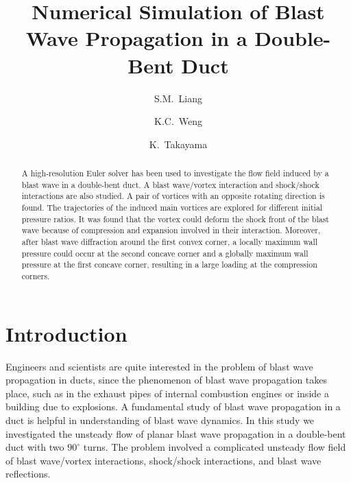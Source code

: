 \documentclass[runningheads]{svmult}
\begin{document}
%
\title*{Numerical Simulation of Blast Wave \protect\newline Propagation in a Double-Bent Duct}
%
%
%
\author{S.M.~Liang
\and K.C.~Weng
\and K.~Takayama}
%
%
%

\maketitle              %
\begin{abstract}
 A high-resolution Euler solver has been used to investigate the flow field induced by a blast wave in a double-bent duct. A blast wave/vortex interaction and shock/shock interactions are also studied. A pair of vortices with an opposite rotating direction is found. The trajectories of the induced main vortices are explored for different initial pressure ratios. It was found that the vortex could deform the shock front of the blast wave because of compression and expansion involved in their interaction. Moreover, after blast wave diffraction around the first convex corner, a locally maximum wall pressure could occur at the second concave corner and a globally maximum wall pressure at the first concave corner, resulting in a large loading at the compression corners.
\end{abstract}

\section{Introduction}
%
Engineers and scientists are quite interested in the problem of blast wave propagation in ducts, since the phenomenon of blast wave propagation takes place, such as in the exhaust pipes of internal combustion engines or inside a building due to explosions. A fundamental study of blast wave propagation in a duct is helpful in understanding of blast wave dynamics. In this study we investigated the unsteady flow of planar blast wave propagation in a double-bent duct with two $90^\circ$ turns. The problem involved a complicated unsteady flow field of blast wave/vortex interactions, shock/shock interactions, and blast wave reflections.
\end{document}
